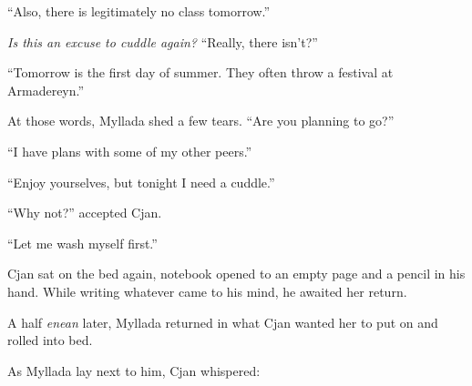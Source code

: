 ``Also, there is legitimately no class tomorrow.''

\emph{Is this an excuse to cuddle again?} ``Really, there isn't?''

``Tomorrow is the first day of summer. They often throw a festival at Armadereyn.''

At those words, Myllada shed a few tears. ``Are you planning to go?''

``I have plans with some of my other peers.''

``Enjoy yourselves, but tonight I need a cuddle.''

``Why not?'' accepted Cjan.

``Let me wash myself first.''

Cjan sat on the bed again, notebook opened to an empty page and a pencil in his hand. While writing whatever came to his mind, he awaited her return.

A half \emph{enean} later, Myllada returned in what Cjan wanted her to put on and rolled into bed.

As Myllada lay next to him, Cjan whispered:


